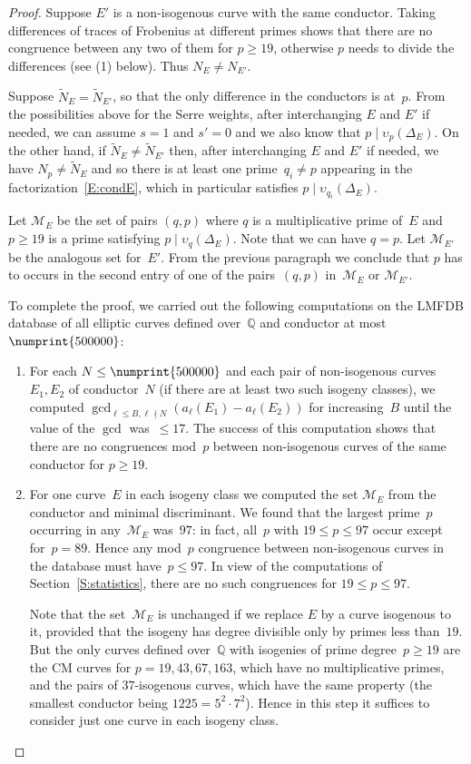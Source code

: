 \documentclass[12pt, reqno]{amsart}
\newcommand{\Q}{\mathbb{Q}}
\newcommand{\calM}{\mathcal{M}}
\newcommand{\vv}{\upsilon}
\numberwithin{equation}{section}
\theoremstyle{definition}
\theoremstyle{remark}
\begin{document}
\begin{proof}
Suppose $E'$ is a non-isogenous curve with the same conductor. Taking differences of traces of Frobenius at different primes shows that 
there are no congruence between any two of them for $p \geq 19$, otherwise $p$ needs to divide the differences (see (1) below). 
Thus $N_E \neq N_{E'}$.

Suppose $\tilde{N}_E = \tilde{N}_{E'}$, so that the only difference in the conductors is at~$p$. From the possibilities above for the Serre weights, after interchanging $E$ and $E'$ if needed, 
we can assume $s=1$ and $s'=0$ and we also know that $p \mid \vv_p(\Delta_E)$. On the other hand, if $\tilde{N}_E \neq \tilde{N}_{E'}$ then, after interchanging $E$ and $E'$ if needed, we have $N_p \neq \tilde{N}_E$ and so there is at least one prime~$q_i \neq p$ appearing in the factorization~\eqref{E:condE}, which in particular satisfies $p \mid \vv_{q_i}(\Delta_E)$.

Let $\calM_E$ be the set of pairs $(q,p)$ where $q$ is a multiplicative prime of~$E$ and
$p \geq 19$ is a prime satisfying $p \mid \vv_{q}(\Delta_E)$.
Note that we can have $q=p$. Let $\calM_{E'}$ be the analogous set for~$E'$. From the previous paragraph we conclude that 
$p$ has to occurs in the second entry of one of the pairs~$(q,p)$ in~$\calM_E$ or $\calM_{E'}$.

To complete the proof, we carried out the following computations on
the LMFDB database of all elliptic curves defined over~$\Q$ and
conductor at most~$\numprint{500000}$:
\begin{enumerate}
\item For each $N\le \numprint{500000}$ and each pair of non-isogenous
  curves~$E_1,E_2$ of conductor~$N$ (if there are at least two such
  isogeny classes), we computed $\gcd_{\ell\le B,
    \ell\nmid N}(a_{\ell}(E_1)-a_{\ell}(E_2))$ for increasing~$B$
  until the value of the $\gcd$ was~${}\le17$.  The success of this
  computation shows that there are no congruences mod~$p$ between
  non-isogenous curves of the same conductor for $p\ge19$.
\item For one curve~$E$ in each isogeny class we computed the set
  $\calM_E$ from the conductor and minimal discriminant.  We found that
  the largest prime~$p$ occurring in any~$\calM_E$ was~$97$: in fact,
  all~$p$ with $19\le p\le97$ occur except for~$p=89$.  Hence any
  mod~$p$ congruence between non-isogenous curves in the database must
  have~$p\le97$.  In view of the computations of
  Section~\ref{S:statistics}, there are no such congruences for $19\le
  p\le97$.

  Note that the set~$\calM_E$ is unchanged if we replace $E$ by a curve
  isogenous to it, provided that the isogeny has degree divisible only
  by primes less than~$19$.  But the only curves defined over~$\Q$ with
  isogenies of prime degree~$p\ge19$ are the CM curves for
  $p=19,43,67,163$, which have no multiplicative primes, and the pairs
  of $37$-isogenous curves, which have the same property (the smallest
  conductor being $1225=5^2\cdot7^2$).  Hence in this step it suffices
  to consider just one curve in each isogeny class.
\end{enumerate}
\end{proof}
\end{document}
